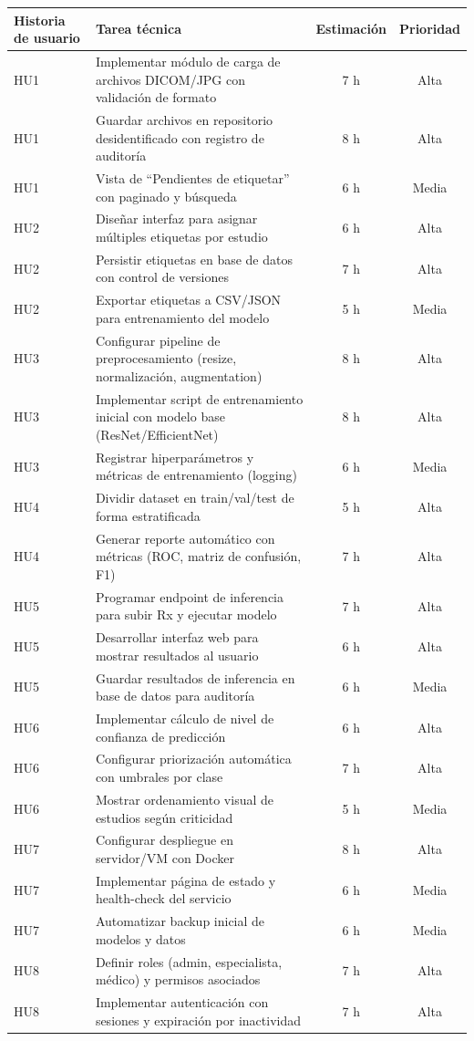 \documentclass[
11pt, %
]{charter}
\begin{document}
\begin{center}
\begin{tabular}{|l|p{8.5cm}|c|c|}
\hline
\textbf{Historia de usuario} & \textbf{Tarea técnica} & \textbf{Estimación} & \textbf{Prioridad} \\
\hline
HU1 & Implementar módulo de carga de archivos DICOM/JPG con validación de formato & 7 h & Alta \\
\hline
HU1 & Guardar archivos en repositorio desidentificado con registro de auditoría & 8 h & Alta \\
\hline
HU1 & Vista de “Pendientes de etiquetar” con paginado y búsqueda & 6 h & Media \\
\hline
HU2 & Diseñar interfaz para asignar múltiples etiquetas por estudio & 6 h & Alta \\
\hline
HU2 & Persistir etiquetas en base de datos con control de versiones & 7 h & Alta \\
\hline
HU2 & Exportar etiquetas a CSV/JSON para entrenamiento del modelo & 5 h & Media \\
\hline
HU3 & Configurar pipeline de preprocesamiento (resize, normalización, augmentation) & 8 h & Alta \\
\hline
HU3 & Implementar script de entrenamiento inicial con modelo base (ResNet/EfficientNet) & 8 h & Alta \\
\hline
HU3 & Registrar hiperparámetros y métricas de entrenamiento (logging) & 6 h & Media \\
\hline
HU4 & Dividir dataset en train/val/test de forma estratificada & 5 h & Alta \\
\hline
HU4 & Generar reporte automático con métricas (ROC, matriz de confusión, F1) & 7 h & Alta \\
\hline
HU5 & Programar endpoint de inferencia para subir Rx y ejecutar modelo & 7 h & Alta \\
\hline
HU5 & Desarrollar interfaz web para mostrar resultados al usuario & 6 h & Alta \\
\hline
HU5 & Guardar resultados de inferencia en base de datos para auditoría & 6 h & Media \\
\hline
HU6 & Implementar cálculo de nivel de confianza de predicción & 6 h & Alta \\
\hline
HU6 & Configurar priorización automática con umbrales por clase & 7 h & Alta \\
\hline
HU6 & Mostrar ordenamiento visual de estudios según criticidad & 5 h & Media \\
\hline
HU7 & Configurar despliegue en servidor/VM con Docker & 8 h & Alta \\
\hline
HU7 & Implementar página de estado y health-check del servicio & 6 h & Media \\
\hline
HU7 & Automatizar backup inicial de modelos y datos & 6 h & Media \\
\hline
HU8 & Definir roles (admin, especialista, médico) y permisos asociados & 7 h & Alta \\
\hline
HU8 & Implementar autenticación con sesiones y expiración por inactividad & 7 h & Alta \\
\hline
\end{tabular}
\end{center}
\end{document}
